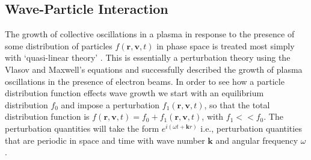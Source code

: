 \subsection{Wave-Particle Interaction}\label{sec:wave_particle}

The growth of collective oscillations in a plasma in response to the presence of some distribution of particles $f(\mathbf{r}, \mathbf{v}, t)$ in phase space is treated most simply with `quasi-linear theory' \citep{vedenov1963}. This is essentially a perturbation theory using the Vlasov and Maxwell's equations and successfully described the growth of plasma oscillations in the presence of electron beams. In order to see how a particle distribution function effects wave growth we start with an equilibrium distribution $f_0$ and impose a perturbation $f_1(\mathbf{r}, \mathbf{v}, t)$, so that the total distribution function is $f(\mathbf{r}, \mathbf{v}, t) = f_0 +f_1(\mathbf{r}, \mathbf{v}, t)$, with $f_1<<f_0$.  The perturbation quantities will take the form $e^{i(\omega t + \mathbf{k}r)}$ i.e., perturbation quantities that are periodic in space and time with wave number $\mathbf{k}$ and angular frequency $\omega$.

